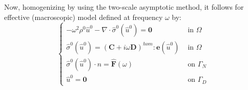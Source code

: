 Now, homogenizing by using the two-scale asymptotic method, it follows for effective (macroscopic) model defined at frequency $\omega$ by:
\begin{equation*}
    \left \{
    \begin{array}{cc}
        -\omega^2 \rho^{0} \hat{u}^0 - \nabla \cdot \hat{\sigma}^0(\hat{u}^0)  = \mathbf{0} & \text{ in } \Omega \\
        \hat{\sigma}^{0} (\hat{u}^0)  = (\mathbf{C} + i\omega \mathbf{D})^{hom}:\mathbf{e}(\hat{u}^0) & \text{ in } \Omega \\
        \hat{\sigma}^{0} (\hat{u}^0) \cdot n = \hat{\mathbf{F}}(\omega) & \text{ on } \Gamma_N \\
        \hat{u}^0 = \mathbf{0} & \text{ on } \Gamma_D
    \end{array}
    \right .
\end{equation*}

